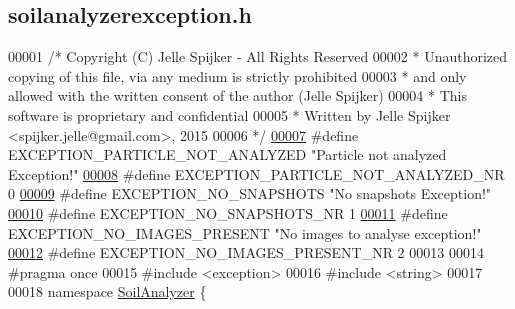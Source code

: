 \hypertarget{soilanalyzerexception_8h_source}{}\subsection{soilanalyzerexception.\+h}
\label{soilanalyzerexception_8h_source}

\begin{DoxyCode}
00001 \textcolor{comment}{/* Copyright (C) Jelle Spijker - All Rights Reserved}
00002 \textcolor{comment}{ * Unauthorized copying of this file, via any medium is strictly prohibited}
00003 \textcolor{comment}{ * and only allowed with the written consent of the author (Jelle Spijker)}
00004 \textcolor{comment}{ * This software is proprietary and confidential}
00005 \textcolor{comment}{ * Written by Jelle Spijker <spijker.jelle@gmail.com>, 2015}
00006 \textcolor{comment}{ */}
\hypertarget{soilanalyzerexception_8h_source_l00007}{}\hyperlink{soilanalyzerexception_8h_ab5a65c5a9faf5f47deb0392d3ce844e8}{00007} \textcolor{preprocessor}{#define EXCEPTION\_PARTICLE\_NOT\_ANALYZED "Particle not analyzed Exception!"}
\hypertarget{soilanalyzerexception_8h_source_l00008}{}\hyperlink{soilanalyzerexception_8h_a0dd1d83fbad6ddcd1f33b4ad1b8df6d7}{00008} \textcolor{preprocessor}{#define EXCEPTION\_PARTICLE\_NOT\_ANALYZED\_NR 0}
\hypertarget{soilanalyzerexception_8h_source_l00009}{}\hyperlink{soilanalyzerexception_8h_a581eb3039f34aae160398101691f6f50}{00009} \textcolor{preprocessor}{#define EXCEPTION\_NO\_SNAPSHOTS "No snapshots Exception!"}
\hypertarget{soilanalyzerexception_8h_source_l00010}{}\hyperlink{soilanalyzerexception_8h_a3269cc147400cdea97b49375c228b3de}{00010} \textcolor{preprocessor}{#define EXCEPTION\_NO\_SNAPSHOTS\_NR 1}
\hypertarget{soilanalyzerexception_8h_source_l00011}{}\hyperlink{soilanalyzerexception_8h_a82750c953749f483d5ca107c1582d5a1}{00011} \textcolor{preprocessor}{#define EXCEPTION\_NO\_IMAGES\_PRESENT "No images to analyse exception!"}
\hypertarget{soilanalyzerexception_8h_source_l00012}{}\hyperlink{soilanalyzerexception_8h_a5fc5b633b3c7215714bc0c4ba87a8bb5}{00012} \textcolor{preprocessor}{#define EXCEPTION\_NO\_IMAGES\_PRESENT\_NR 2}
00013 
00014 \textcolor{preprocessor}{#pragma once}
00015 \textcolor{preprocessor}{#include <exception>}
00016 \textcolor{preprocessor}{#include <string>}
00017 
00018 \textcolor{keyword}{namespace }\hyperlink{namespace_soil_analyzer}{SoilAnalyzer} \{

\end{DoxyCode}
